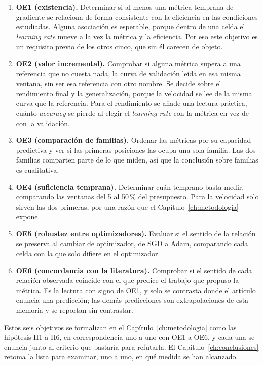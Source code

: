 \begin{enumerate}
  \item \textbf{OE1 (existencia).} Determinar si al menos una métrica temprana de gradiente se relaciona de forma consistente con la eficiencia en las condiciones estudiadas. Alguna asociación es esperable, porque dentro de una celda el \emph{learning rate} mueve a la vez la métrica y la eficiencia. Por eso este objetivo es un requisito previo de los otros cinco, que sin él carecen de objeto. \label{obj:existencia}
  \item \textbf{OE2 (valor incremental).} Comprobar si alguna métrica supera a una referencia que no cuesta nada, la curva de validación leída en esa misma ventana, sin ser esa referencia con otro nombre. Se decide sobre el rendimiento final y la generalización, porque la velocidad se lee de la misma curva que la referencia. Para el rendimiento se añade una lectura práctica, cuánto \emph{accuracy} se pierde al elegir el \emph{learning rate} con la métrica en vez de con la validación. \label{obj:incremental}
  \item \textbf{OE3 (comparación de familias).} Ordenar las métricas por su capacidad predictiva y ver si las primeras posiciones las ocupa una sola familia. Las dos familias comparten parte de lo que miden, así que la conclusión sobre familias es cualitativa. \label{obj:familias}
  \item \textbf{OE4 (suficiencia temprana).} Determinar cuán temprano basta medir, comparando las ventanas del 5 al 50\,\% del presupuesto. Para la velocidad solo sirven las dos primeras, por una razón que el Capítulo~\ref{ch:metodologia} expone. \label{obj:temprana}
  \item \textbf{OE5 (robustez entre optimizadores).} Evaluar si el sentido de la relación se preserva al cambiar de optimizador, de SGD a Adam, comparando cada celda con la que solo difiere en el optimizador. \label{obj:robustez}
  \item \textbf{OE6 (concordancia con la literatura).} Comprobar si el sentido de cada relación observada coincide con el que predice el trabajo que propuso la métrica. Es la lectura con signo de OE1, y solo se contrasta donde el artículo enuncia una predicción; las demás predicciones son extrapolaciones de esta memoria y se reportan sin contrastar. \label{obj:concordancia}
\end{enumerate}

Estos seis objetivos se formalizan en el Capítulo~\ref{ch:metodologia} como las hipótesis H1 a H6, en correspondencia uno a uno con OE1 a OE6, y cada una se enuncia junto al criterio que bastaría para refutarla. El Capítulo~\ref{ch:conclusiones} retoma la lista para examinar, uno a uno, en qué medida se han alcanzado.

